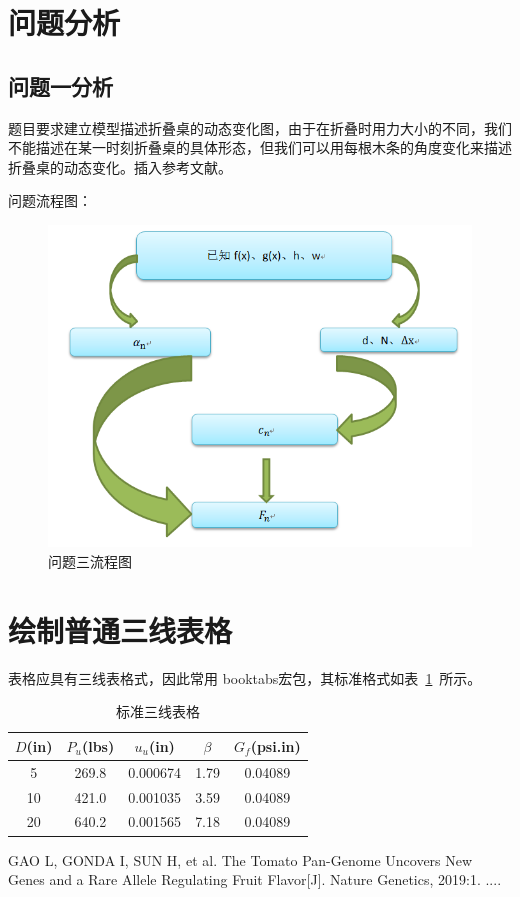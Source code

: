 \documentclass{zzblmod}
\begin{document}
\section{问题分析}

\subsection{问题一分析}
题目要求建立模型描述折叠桌的动态变化图，由于在折叠时用力大小的不同，我们不能描述在某一时刻折叠桌的具体形态，但我们可以用每根木条的角度变化来描述折叠桌的动态变化。插入参考文献\cite{bib:one}。

问题流程图：
\begin{figure}[!h]
	\centering
	\includegraphics[width=.6\textwidth]{1.png}
	\caption{问题三流程图}
\end{figure}

\section{绘制普通三线表格}
表格应具有三线表格式，因此常用 booktabs宏包，其标准格式如表~\ref{tab001}~所示。
\begin{table}[!htbp]
	\caption{标准三线表格}\label{tab001} \centering
	\begin{tabular}{ccccc}
		\toprule[1.5pt]
		$D$(in) & $P_u$(lbs) & $u_u$(in) & $\beta$ & $G_f$(psi.in)\\
		\midrule[1pt]
		5 & 269.8 & 0.000674 & 1.79 & 0.04089\\
		10 & 421.0 & 0.001035 & 3.59 & 0.04089\\
		20 & 640.2 & 0.001565 & 7.18 & 0.04089\\
		\bottomrule[1.5pt]
	\end{tabular}
\end{table}

\begin{thebibliography}{9}%
	 GAO L, GONDA I, SUN H, et al. The Tomato Pan-Genome Uncovers New Genes and a	Rare Allele Regulating Fruit Flavor[J]. Nature Genetics, 2019:1.
	 ....
\end{thebibliography}
\end{document}
